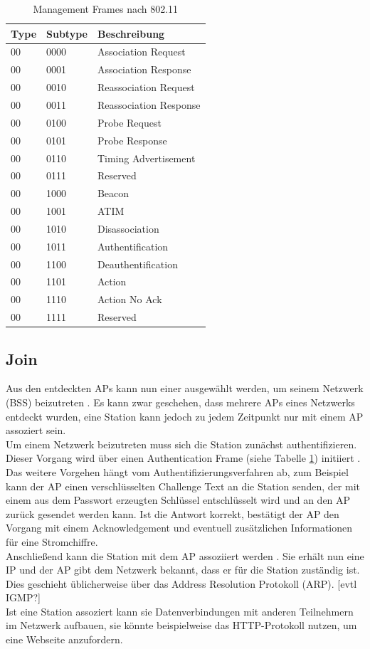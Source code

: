 \begin{table}[h]
	\centering
	\caption{Management Frames nach 802.11 \cite{ieee2012management}}
	\label{table:management}
	\begin{tabular}{l|l|l}
		Type & Subtype & Beschreibung \\
		\hline
		00 & 0000 & Association Request  \\
		00 & 0001 & Association Response  \\
		00 & 0010 & Reassociation Request  \\
		00 & 0011 & Reassociation Response  \\
		00 & 0100 & Probe Request  \\
		00 & 0101 & Probe Response  \\
		00 & 0110 & Timing Advertisement  \\
		00 & 0111 & Reserved  \\
		00 & 1000 & Beacon  \\
		00 & 1001 & ATIM  \\
		00 & 1010 & Disassociation  \\
		00 & 1011 & Authentification  \\
		00 & 1100 & Deauthentification  \\
		00 & 1101 & Action  \\
		00 & 1110 & Action No Ack  \\
		00 & 1111 & Reserved  \\
	\end{tabular}
\end{table}

\subsection{Join}
Aus den entdeckten APs kann nun einer ausgewählt werden, um seinem Netzwerk (BSS) beizutreten \cite{ieee2012join}.
Es kann zwar geschehen, dass mehrere APs eines Netzwerks entdeckt wurden, eine Station kann jedoch zu jedem Zeitpunkt nur mit einem AP assoziert sein. \\
Um einem Netzwerk beizutreten muss sich die Station zunächst authentifizieren. 
Dieser Vorgang wird über einen Authentication Frame (siehe Tabelle \ref{table:management}) initiiert \cite{ieee2012auth}. 
Das weitere Vorgehen hängt vom Authentifizierungsverfahren ab, zum Beispiel kann der AP einen verschlüsselten Challenge Text an die Station senden, der mit einem aus dem Passwort erzeugten Schlüssel entschlüsselt wird und an den AP zurück gesendet werden kann. 
Ist die Antwort korrekt, bestätigt der AP den Vorgang mit einem Acknowledgement und eventuell zusätzlichen Informationen für eine Stromchiffre. \\
Anschließend kann die Station mit dem AP assoziiert werden \cite{ieee2012associate}. 
Sie erhält nun eine IP und der AP gibt dem Netzwerk bekannt, dass er für die Station zuständig ist. 
Dies geschieht üblicherweise über das Address Resolution Protokoll (ARP). [evtl IGMP?] \\%
Ist eine Station assoziert kann sie Datenverbindungen mit anderen Teilnehmern im Netzwerk aufbauen, sie könnte beispielweise das HTTP-Protokoll nutzen, um eine Webseite anzufordern.


